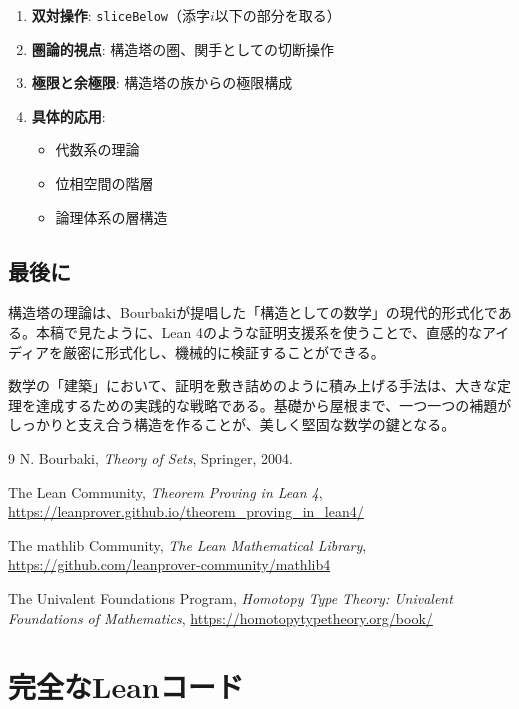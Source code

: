 \documentclass[a4paper,11pt]{article}
\theoremstyle{definition}
\begin{document}
\begin{enumerate}
    \item \textbf{双対操作}: \texttt{sliceBelow}（添字$i$以下の部分を取る）
    
    \item \textbf{圏論的視点}: 構造塔の圏、関手としての切断操作
    
    \item \textbf{極限と余極限}: 構造塔の族からの極限構成
    
    \item \textbf{具体的応用}: 
    \begin{itemize}
        \item 代数系の理論
        \item 位相空間の階層
        \item 論理体系の層構造
    \end{itemize}
\end{enumerate}

\subsection{最後に}

構造塔の理論は、Bourbakiが提唱した「構造としての数学」の現代的形式化である。本稿で見たように、Lean 4のような証明支援系を使うことで、直感的なアイディアを厳密に形式化し、機械的に検証することができる。

数学の「建築」において、証明を敷き詰めのように積み上げる手法は、大きな定理を達成するための実践的な戦略である。基礎から屋根まで、一つ一つの補題がしっかりと支え合う構造を作ることが、美しく堅固な数学の鍵となる。

\begin{thebibliography}{9}
N. Bourbaki, \textit{Theory of Sets}, Springer, 2004.

The Lean Community, \textit{Theorem Proving in Lean 4}, 
\url{https://leanprover.github.io/theorem_proving_in_lean4/}

The mathlib Community, \textit{The Lean Mathematical Library},
\url{https://github.com/leanprover-community/mathlib4}

The Univalent Foundations Program, \textit{Homotopy Type Theory: 
Univalent Foundations of Mathematics}, 
\url{https://homotopytypetheory.org/book/}
\end{thebibliography}

\appendix
\section{完全なLeanコード}
\end{document}
